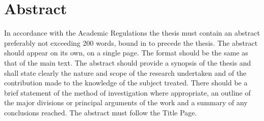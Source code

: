 \chapter*{Abstract}
In accordance with the Academic Regulations the thesis must contain an abstract preferably not exceeding 200 words, bound in to precede the thesis. The abstract should appear on its own, on a single page.  The format should be the same as that of the main text. The abstract should provide a synopsis of the thesis and shall state clearly the nature and scope of the research undertaken and of the contribution made to the knowledge of the subject treated. There should be a brief statement of the method of investigation where appropriate, an outline of the major divisions or principal arguments of the work and a summary of any conclusions reached. The abstract must follow the Title Page.
\clearpage